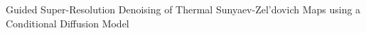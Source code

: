 \documentclass[]{article}
\begin{document}
Guided Super-Resolution Denoising of Thermal Sunyaev-Zel'dovich Maps using a Conditional Diffusion Model
\end{document}
